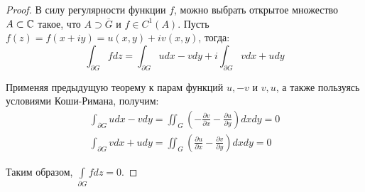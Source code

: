 \begin{proof}
	В силу регулярности функции $f$, можно выбрать открытое множество $A \subset \mathbb{C}$ такое, что $A \supset \overline{G}$ и $f \in C^1(A)$. Пусть $f(z) = f(x + iy) = u(x, y) + iv(x, y)$, тогда:
	\[\int_{\partial G} fdz = \int_{\partial G} udx - vdy + i\int_{\partial G} vdx + udy\]
	
	Применяя предыдущую теорему к парам функций $u, -v$ и $v, u$, а также пользуясь условиями Коши-Римана, получим:
	\begin{gather*}
		\int_{\partial G} udx - vdy  = \iint_G \left(-\frac{\partial v}{\partial x} - \frac{\partial u}{\partial y}\right)dxdy = 0
		\\
		\int_{\partial G} vdx + udy  = \iint_G \left(\frac{\partial u}{\partial x} - \frac{\partial v}{\partial y}\right)dxdy = 0
	\end{gather*}

	Таким образом, $\int\limits_{\partial G} fdz = 0$.
\end{proof}